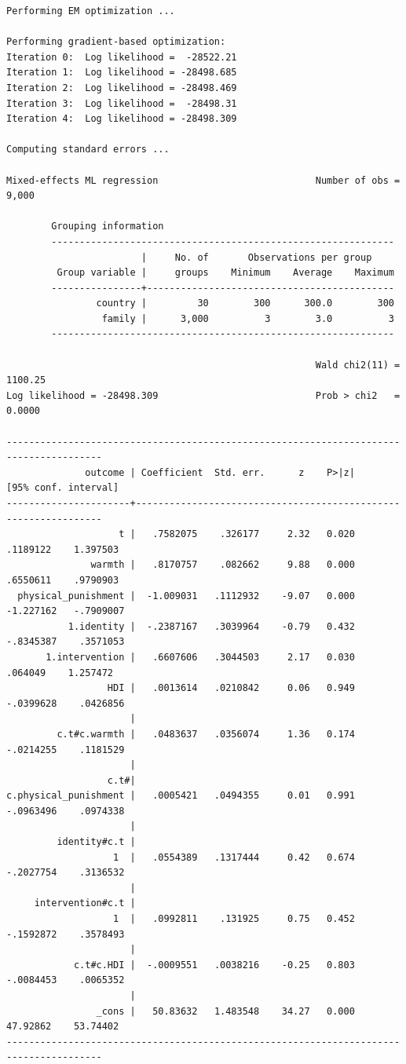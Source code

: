 \documentclass[
  letterpaper,
  DIV=11,
  numbers=noendperiod]{scrreprt}
\begin{document}
\begin{verbatim}
Performing EM optimization ...

Performing gradient-based optimization: 
Iteration 0:  Log likelihood =  -28522.21  
Iteration 1:  Log likelihood = -28498.685  
Iteration 2:  Log likelihood = -28498.469  
Iteration 3:  Log likelihood =  -28498.31  
Iteration 4:  Log likelihood = -28498.309  

Computing standard errors ...

Mixed-effects ML regression                            Number of obs =   9,000

        Grouping information
        -------------------------------------------------------------
                        |     No. of       Observations per group
         Group variable |     groups    Minimum    Average    Maximum
        ----------------+--------------------------------------------
                country |         30        300      300.0        300
                 family |      3,000          3        3.0          3
        -------------------------------------------------------------

                                                       Wald chi2(11) = 1100.25
Log likelihood = -28498.309                            Prob > chi2   =  0.0000

---------------------------------------------------------------------------------------
              outcome | Coefficient  Std. err.      z    P>|z|     [95% conf. interval]
----------------------+----------------------------------------------------------------
                    t |   .7582075    .326177     2.32   0.020     .1189122    1.397503
               warmth |   .8170757    .082662     9.88   0.000     .6550611    .9790903
  physical_punishment |  -1.009031   .1112932    -9.07   0.000    -1.227162   -.7909007
           1.identity |  -.2387167   .3039964    -0.79   0.432    -.8345387    .3571053
       1.intervention |   .6607606   .3044503     2.17   0.030      .064049    1.257472
                  HDI |   .0013614   .0210842     0.06   0.949    -.0399628    .0426856
                      |
         c.t#c.warmth |   .0483637   .0356074     1.36   0.174    -.0214255    .1181529
                      |
                  c.t#|
c.physical_punishment |   .0005421   .0494355     0.01   0.991    -.0963496    .0974338
                      |
         identity#c.t |
                   1  |   .0554389   .1317444     0.42   0.674    -.2027754    .3136532
                      |
     intervention#c.t |
                   1  |   .0992811    .131925     0.75   0.452    -.1592872    .3578493
                      |
            c.t#c.HDI |  -.0009551   .0038216    -0.25   0.803    -.0084453    .0065352
                      |
                _cons |   50.83632   1.483548    34.27   0.000     47.92862    53.74402
---------------------------------------------------------------------------------------


\end{verbatim}
\end{document}
